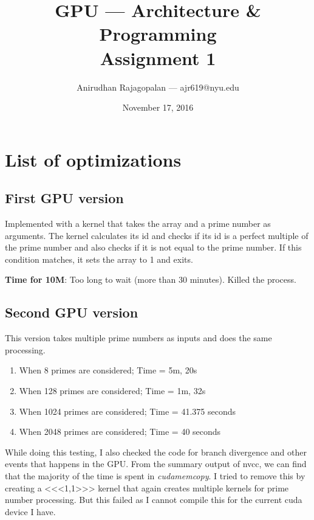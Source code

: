 \documentclass{article}
\begin{document}
\title{GPU --- Architecture \& Programming \\ Assignment 1}
\author{Anirudhan Rajagopalan --- ajr619@nyu.edu}
\date{November 17, 2016}

\maketitle

\newpage
\section{List of optimizations}
\subsection{First GPU version}
Implemented with a kernel that takes the array and a prime number as arguments.  The kernel calculates its id and checks if its id is a perfect multiple of the prime number and also checks if it is not equal to the prime number.  If this condition matches, it sets the array to 1 and exits.

\textbf{Time for 10M}: Too long to wait (more than 30 minutes).  Killed the process.

\subsection{Second GPU version}

This version takes multiple prime numbers as inputs and does the same processing.
\begin{enumerate}
    \item When 8 primes are considered; Time = 5m, 20s
    \item When 128 primes are considered; Time = 1m, 32s
    \item When 1024 primes are considered; Time = 41.375 seconds
    \item When 2048 primes are considered; Time =  40 seconds
\end{enumerate}

While doing this testing, I also checked the code for branch divergence and other events that happens in the GPU\@.  From the summary output of nvcc, we can find that the majority of the time is spent in \textit{cudamemcopy}.
I tried to remove this by creating a <<<1,1>>> kernel that again creates multiple kernels for prime number processing.  
But this failed as I cannot compile this for the current cuda device I have.
\end{document}
